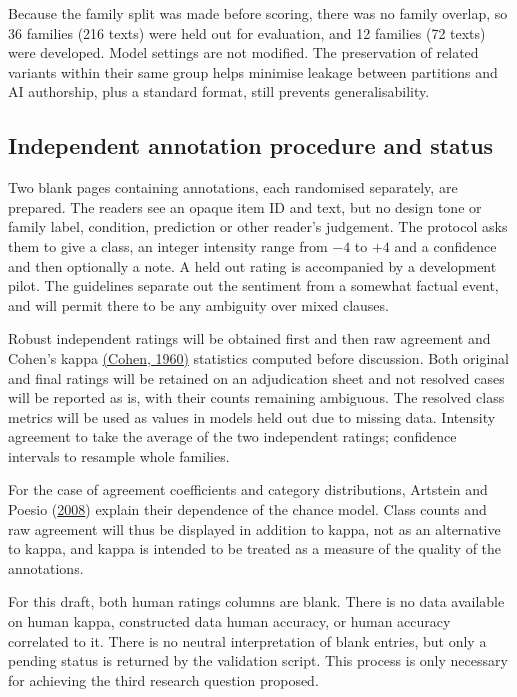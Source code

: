 \documentclass[11pt]{article}
\begin{document}
Because the family split was made before scoring, there was no family overlap, so 36 families (216 texts) were held out for evaluation, and 12 families (72 texts) were developed. Model settings are not modified. The preservation of related variants within their same group helps minimise leakage between partitions and AI authorship, plus a standard format, still prevents generalisability.


\subsection{Independent annotation procedure and status}

Two blank pages containing annotations, each randomised separately, are prepared. The readers see an opaque item ID and text, but no design tone or family label, condition, prediction or other reader's judgement. The protocol asks them to give a class, an integer intensity range from $-4$ to $+4$ and a confidence and then optionally a note. A held out rating is accompanied by a development pilot. The guidelines separate out the sentiment from a somewhat factual event, and will permit there to be any ambiguity over mixed clauses.


Robust independent ratings will be obtained first and then raw agreement and Cohen's kappa \hyperlink{ref_cohen1960agreement}{(Cohen, 1960)} statistics computed before discussion. Both original and final ratings will be retained on an adjudication sheet and not resolved cases will be reported as is, with their counts remaining ambiguous. The resolved class metrics will be used as values in models held out due to missing data. Intensity agreement to take the average of the two independent ratings; confidence intervals to resample whole families.


For the case of agreement coefficients and category distributions, Artstein and Poesio (\hyperlink{ref_artstein2008agreement}{2008}) explain their dependence of the chance model. Class counts and raw agreement will thus be displayed in addition to kappa, not as an alternative to kappa, and kappa is intended to be treated as a measure of the quality of the annotations.


For this draft, both human ratings columns are blank. There is no data available on human kappa, constructed data human accuracy, or human accuracy correlated to it. There is no neutral interpretation of blank entries, but only a pending status is returned by the validation script. This process is only necessary for achieving the third research question proposed.
\end{document}
